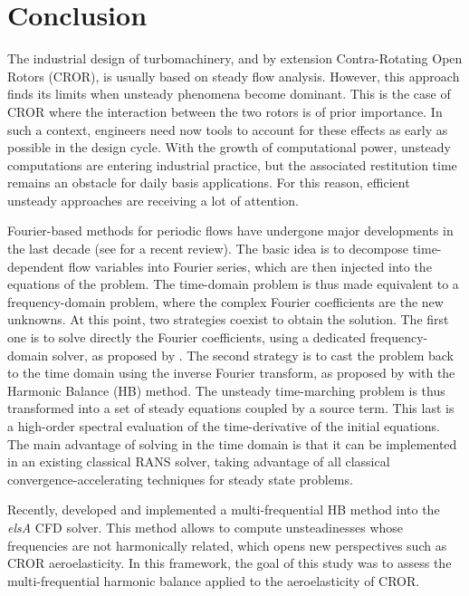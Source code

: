 
\chapter*{Conclusion}

The industrial design of turbomachinery, and by extension Contra-Rotating
Open Rotors (CROR), is usually based on steady flow analysis. 
However, this approach finds its limits 
when unsteady phenomena become dominant. This is the case of 
CROR where the interaction between the
two rotors is of prior importance. In such a
context, engineers need now tools to account for these effects as
early as possible in the design cycle. With the growth of
computational power, unsteady computations are entering industrial
practice, but the associated restitution time remains an obstacle for
daily basis applications. For this reason, efficient
unsteady approaches are receiving a lot of attention. 

Fourier-based methods for periodic flows have undergone major
developments in the last decade (see \citet{He2010} for a recent
review). The basic idea is to decompose
time-dependent flow variables into Fourier series, which are then
injected into the equations of the problem. The time-domain problem is
thus made equivalent to a frequency-domain problem, where the complex
Fourier coefficients are the new unknowns.
At this point, two
strategies coexist to obtain the solution. The first one is to solve
directly the Fourier coefficients, using a dedicated
frequency-domain solver, as proposed by \citet{He1998}. 
The second strategy is to cast the
problem back to the time domain using the inverse Fourier transform, as
proposed by \citet{Hall2002} with the Harmonic
Balance (HB) method. The unsteady time-marching problem is thus
transformed into a set of steady equations coupled by a source term.
This last is a high-order spectral evaluation of the time-derivative of the
initial equations. The main advantage of solving in the time domain is
that it can be implemented in an existing classical RANS solver,
taking advantage of all classical convergence-accelerating techniques
for steady state problems.

Recently, \citet{ThesisGuedeney} developed and implemented a
multi-frequential HB method into the \emph{elsA} CFD solver. 
This method allows to compute unsteadinesses whose frequencies
are not harmonically related, which opens new perspectives
such as CROR aeroelasticity.
In this framework, the goal of this study 
was to assess the multi-frequential 
harmonic balance applied to the aeroelasticity of CROR. 

